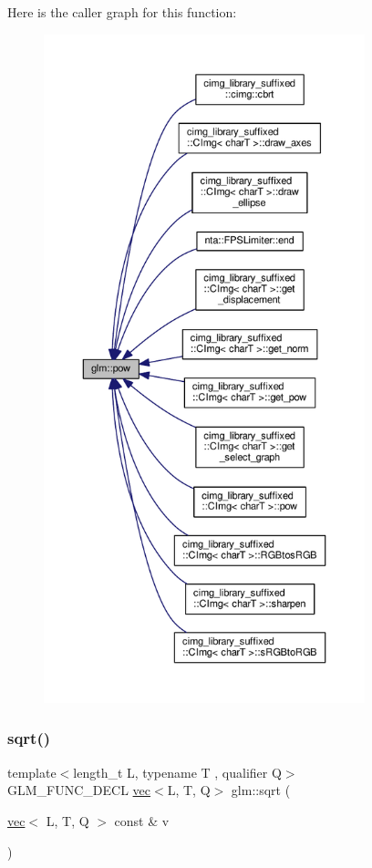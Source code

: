 Here is the caller graph for this function\+:
\nopagebreak
\begin{figure}[H]
\begin{center}
\leavevmode
\includegraphics[height=550pt]{df/d74/group__core__func__exponential_ga2254981952d4f333b900a6bf5167a6c4_icgraph}
\end{center}
\end{figure}
\mbox{\label{group__core__func__exponential_gaa83e5f1648b7ccdf33b87c07c76cb77c}} 
\subsubsection{\texorpdfstring{sqrt()}{sqrt()}}
{\footnotesize\ttfamily template$<$length\+\_\+t L, typename T , qualifier Q$>$ \\
G\+L\+M\+\_\+\+F\+U\+N\+C\+\_\+\+D\+E\+CL \hyperlink{structglm_1_1vec}{vec}$<$L, T, Q$>$ glm\+::sqrt (\begin{DoxyParamCaption}\item[{\hyperlink{structglm_1_1vec}{vec}$<$ L, T, Q $>$ const \&}]{v }\end{DoxyParamCaption})}



